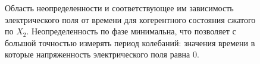 \begin{figure}
\centering



\caption{Область неопределенности и соответствующее им зависимость
  электрического поля от времени для когерентного состояния сжатого по
  $X_2$. Неопределенность по фазе минимальна, что позволяет с большой
  точностью измерять период колебаний: значения времени в которые
  напряженность электрического поля равна 0.}
\label{figPart3Squeezed_3}
\end{figure}
